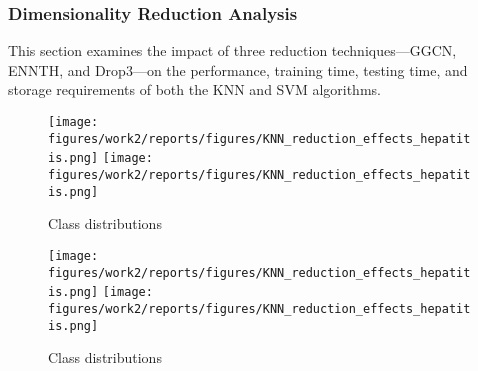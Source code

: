 \subsubsection{Dimensionality Reduction Analysis}
\label{subsubsec:discussion-reduction}

This section examines the impact of three reduction techniques—GGCN, ENNTH, and Drop3—on the performance, training time, testing time, and storage requirements of both the KNN and SVM algorithms.




\begin{figure}
    \centering
    \texttt{[image: figures/work2/reports/figures/KNN\_reduction\_effects\_hepatitis.png]}
    \texttt{[image: figures/work2/reports/figures/KNN\_reduction\_effects\_hepatitis.png]}
    \caption{Class distributions}
    \label{fig:class-distributions}
\end{figure}

\begin{figure}
    \centering
    \texttt{[image: figures/work2/reports/figures/KNN\_reduction\_effects\_hepatitis.png]}
    \texttt{[image: figures/work2/reports/figures/KNN\_reduction\_effects\_hepatitis.png]}
    \caption{Class distributions}
    \label{fig:class-distributions}
\end{figure}


